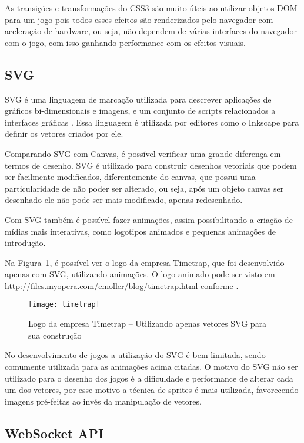 As transições e transformações do CSS3 são muito úteis ao utilizar
objetos DOM para um jogo pois todos esses efeitos são renderizados
pelo navegador com aceleração de hardware, ou seja, não dependem de
várias interfaces do navegador com o jogo, com isso ganhando
performance com os efeitos visuais.

\subsection{SVG}

SVG é uma linguagem de marcação utilizada para descrever aplicações de gráficos
bi-dimensionais e imagens, e um conjunto de scripts relacionados a
interfaces gráficas \cite{website:w3csvg}. Essa linguagem é utilizada por
editores como o Inkscape para definir os vetores criados por ele.

Comparando SVG com Canvas, é possível verificar uma grande diferença
em termos de desenho. SVG é utilizado para construir desenhos
vetoriais que podem ser facilmente modificados, diferentemente do
canvas, que possui uma particularidade de não poder ser alterado, ou
seja, após um objeto canvas ser desenhado ele não pode ser mais
modificado, apenas redesenhado.

Com SVG também é possível fazer animações, assim possibilitando a
criação de mídias mais interativas, como logotipos animados e pequenas
animações de introdução.

Na Figura~\ref{img:timetrap}, é possível ver o logo da empresa
Timetrap, que foi desenvolvido apenas com SVG, utilizando animações. O
logo animado pode ser visto em
http://files.myopera.com/emoller/blog/timetrap.html conforme
\cite{website:svgtimetrap}.

\begin{figure}[H]
  \centering
	\texttt{[image: timetrap]}
  \caption{Logo da empresa Timetrap {--} Utilizando apenas vetores SVG para sua construção}
  \label{img:timetrap}
\end{figure}

No desenvolvimento de jogos a utilização do SVG é bem limitada, sendo
comumente utilizada para as animações acima citadas. O motivo do SVG
não ser utilizado para o desenho dos jogos é a dificuldade e
performance de alterar cada um dos vetores, por esse motivo
a técnica de sprites é mais utilizada, favorecendo imagens pré-feitas
ao invés da manipulação de vetores.


\subsection{WebSocket API}

